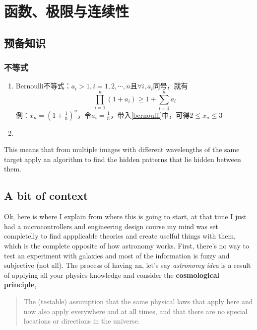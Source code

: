 
\chapter{函数、极限与连续性}

\section{预备知识}

\subsection{不等式}

\begin{enumerate}
\item Bernoulli不等式：$a_i>1, i = 1,2,\cdots, n$且$\forall i, a_i$同号，就有
\begin{equation}\label{bernoulli}
  \prod_{i=1}^{n}(1+a_i) \geq 1+\sum_{i=1}^{n}a_i
\end{equation}
例：$x_n=(1+\frac{1}{n})^n$，令$a_i=\frac{1}{n}$，带入\ref{bernoulli}中，可得$2\leq x_n \leq 3$
\item 
\end{enumerate}



This means that from multiple images with different wavelengths of the same target apply an algorithm to find the hidden patterns that lie hidden between them.

\section{A bit of context}
Ok, here is where I explain from where this is going to start, at that time I just had a microcontrollers and engineering design course my mind was set completelly to find appplicable theories and create uselful things with them, which is the complete opposite of how astronomy works. First, there's no way to test an experiment with galaxies and most of the information is fuzzy and subjective (not all). The process of having an, let's say \emph{astronomy idea} is a result of applying all your physics knowledge and consider the \textbf{cosmological principle},
\begin{quote}
The (testable) assumption that the same physical laws that apply here and now also apply everywhere and at all times, and that there are no special locations or directions in the universe.
\end{quote}

